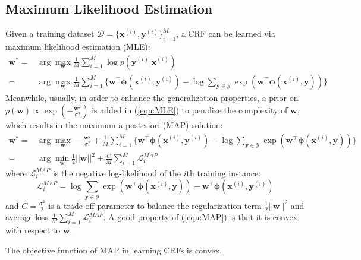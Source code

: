 \subsection{Maximum Likelihood Estimation}
\label{subsec:MLE}
Given a training dataset $\mathcal{D}=\{\mathbf{x}^{(i)},\mathbf{y}^{(i)}\}_{i=1}^M$, a CRF can be learned via maximum likelihood estimation (MLE):
\begin{equation}
    \begin{array}{rl}
        \mathbf{w}^* =& \displaystyle\arg\max_{\mathbf{w}} \frac{1}{M}\sum_{i=1}^M \log p(\mathbf{y}^{(i)}|\mathbf{x}^{(i)}) \\
                     =& \displaystyle\arg\max_{\mathbf{w}} \frac{1}{M}\sum_{i=1}^M \{\mathbf{w}^\top \boldsymbol{\phi}(\mathbf{x}^{(i)},\mathbf{y}^{(i)}) -\log \sum_{\mathbf{y}\in\mathcal{Y}} \exp(\mathbf{w}^\top \boldsymbol{\phi}(\mathbf{x}^{(i)},\mathbf{y}))\}
    \end{array}
    \label{equ:MLE}
\end{equation}
Meanwhile, usually, in order to enhance the generalization properties, a prior on $p(\mathbf{w})\propto \exp(-\frac{\mathbf{w}^2}{\sigma^2})$ is added in (\ref{equ:MLE}) to penalize the complexity of $\mathbf{w}$, which 
results in the maximum a posteriori (MAP) solution:
\begin{equation}
    \begin{array}{rl}
        \mathbf{w}^* =& \displaystyle\arg\max_{\mathbf{w}}  -\frac{\mathbf{w}^2}{\sigma^2} +\frac{1}{M}\sum_{i=1}^M \{\mathbf{w}^\top \boldsymbol{\phi}(\mathbf{x}^{(i)},\mathbf{y}^{(i)}) -\log \sum_{\mathbf{y}\in\mathcal{Y}} \exp(\mathbf{w}^\top \boldsymbol{\phi}(\mathbf{x}^{(i)},\mathbf{y}))\}  \\ 
                     =& \displaystyle\arg\min_{\mathbf{w}} \frac{1}{2} ||\mathbf{w}||^2+  \frac{C}{M}\sum_{i=1}^M \mathcal{L}^{MAP}_i 
    \end{array}
    \label{equ:MAP}
\end{equation}
where $\mathcal{L}_i^{MAP}$ is the negative log-likelihood of the $i$th training instance:  
\begin{equation}
    \mathcal{L}^{MAP}_i=\log \sum_{\mathbf{y}\in\mathcal{Y}} \exp(\mathbf{w}^\top \boldsymbol{\phi}(\mathbf{x}^{(i)},\mathbf{y}))-\mathbf{w}^\top \boldsymbol{\phi}(\mathbf{x}^{(i)},\mathbf{y}^{(i)})
    \label{equ:MAP_loss}
\end{equation}
and $C=\frac{\sigma^2}{2}$ is a trade-off parameter to balance the regularization term $\frac{1}{2} ||\mathbf{w}||^2$ and average loss $\frac{1}{M}\sum_{i=1}^M \mathcal{L}^{MAP}_i$. A good property 
of (\ref{equ:MAP}) is that it is convex with respect to $\mathbf{w}$. 
\begin{proposition}
    The objective function of MAP in learning CRFs is convex.
\label{pro:MAP_convex}
\end{proposition}

